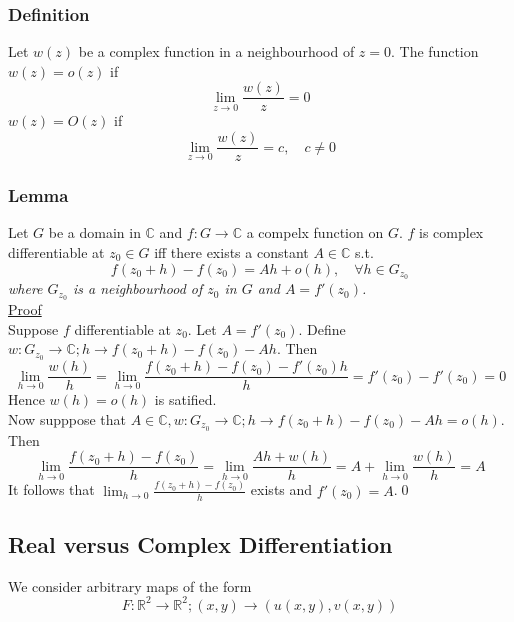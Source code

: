 \documentclass[a4paper, 12pt, twoside]{article}
\begin{document}
                \subsubsection{Definition}
                    Let $w(z)$ be a complex function in a neighbourhood of $z=0$. The function $w(z)=o(z)$ if
                    $$\lim_{z\to0}\frac{w(z)}{z}=0$$
                    $w(z)=O(z)$ if
                    $$\lim_{z\to0}\frac{w(z)}{z}=c,\quad c\neq 0$$
                \subsubsection{Lemma}
                    Let $G$ be a domain in $\mathbb{C}$ and $f:G \to  \mathbb{C}$ a compelx function on $G$. $f$ is complex differentiable at $z_{0}\in G$ iff there exists a constant $A\in \mathbb{C}$ s.t.
                    $$ f(z_{0}+h)-f(z_{0})=Ah+o(h),\quad \forall h\in G_{z_{0}}$$
                    \textit{where $G_{z_{0}}$ is a neighbourhood of $z_{0}$ in $G$ and $A=f'(z_{0})$.}\\
                    \underline{Proof}\\
                    Suppose $f$ differentiable at $z_{0}$. Let $A=f'(z_{0})$. Define $w:G_{z_{0}} \to  \mathbb{C};h\to f(z_{0}+h)-f(z_{0})-Ah$. Then
                    $$\lim_{h\to0}\frac{w(h)}{h}=\lim_{h\to0}\frac{f(z_{0}+h)-f(z_{0})-f'(z_{0})h}{h}=f'(z_{0})-f'(z_{0})=0$$
                    Hence $w(h)=o(h)$ is satified.\\
                    Now supppose that $A\in \mathbb{C}, w:G_{z_{0}} \to  \mathbb{C};h\to f(z_{0}+h)-f(z_{0})-Ah=o(h)$. Then
                    $$ \lim_{h\to0}\frac{f(z_{0}+h)-f(z_{0})}{h}=\lim_{h\to0}\frac{Ah+w(h)}{h}= A+\lim_{h\to0}\frac{w(h)}{h}=A$$
                    It follows that $\lim_{h\to0}\frac{f(z_{0}+h)-f(z_{0})}{h}$ exists and $f'(z_{0})=A$.\qed
            \newpage
            \subsection{Real versus Complex Differentiation}
                We consider arbitrary maps of the form
                $$F:\mathbb{R}^{2}\to \mathbb{R}^{2};(x,y)\to(u(x,y),v(x,y)) $$
\end{document}
